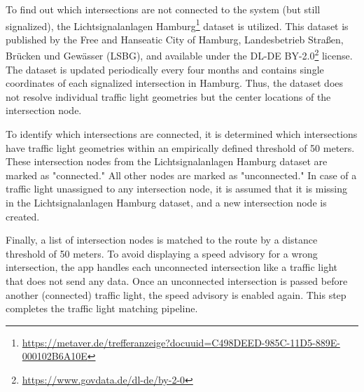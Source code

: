 To find out which intersections are not connected to the system (but still signalized), the Lichtsignalanlagen Hamburg\footnote{\url{https://metaver.de/trefferanzeige?docuuid=C498DEED-985C-11D5-889E-000102B6A10E}} dataset is utilized. This dataset is published by the Free and Hanseatic City of Hamburg, Landesbetrieb Straßen, Brücken und Gewässer (LSBG), and available under the DL-DE BY-2.0\footnote{\url{https://www.govdata.de/dl-de/by-2-0}} license. The dataset is updated periodically every four months and contains single coordinates of each signalized intersection in Hamburg. Thus, the dataset does not resolve individual traffic light geometries but the center locations of the intersection node. 

To identify which intersections are connected, it is determined which intersections have traffic light geometries within an empirically defined threshold of 50 meters. These intersection nodes from the Lichtsignalanlagen Hamburg dataset are marked as "connected." All other nodes are marked as "unconnected." In case of a traffic light unassigned to any intersection node, it is assumed that it is missing in the Lichtsignalanlagen Hamburg dataset, and a new intersection node is created. 

Finally, a list of intersection nodes is matched to the route by a distance threshold of 50 meters. To avoid displaying a speed advisory for a wrong intersection, the app handles each unconnected intersection like a traffic light that does not send any data. Once an unconnected intersection is passed before another (connected) traffic light, the speed advisory is enabled again. This step completes the traffic light matching pipeline.

